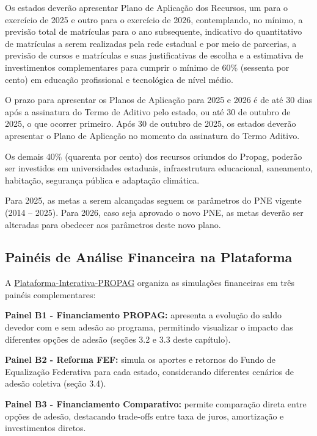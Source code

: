 Os estados deverão apresentar Plano de Aplicação dos Recursos, um para o exercício de 2025 e outro para o exercício de 2026, contemplando, no mínimo, a previsão total de matrículas para o ano subsequente, indicativo do quantitativo de matrículas a serem realizadas pela rede estadual e por meio de parcerias, a previsão de cursos e matrículas e suas justificativas de escolha e a estimativa de investimentos complementares para cumprir o mínimo de 60\% (sessenta por cento) em educação profissional e tecnológica de nível médio.

O prazo para apresentar os Planos de Aplicação para 2025 e 2026 é de até 30 dias após a assinatura do Termo de Aditivo pelo estado, ou até 30 de outubro de 2025, o que ocorrer primeiro. Após 30 de outubro de 2025, os estados deverão apresentar o Plano de Aplicação no momento da assinatura do Termo Aditivo. 

Os demais 40\% (quarenta por cento) dos recursos oriundos do Propag, poderão ser investidos em universidades estaduais, infraestrutura educacional, saneamento, habitação, segurança pública e adaptação climática.

Para 2025, as metas a serem alcançadas seguem os parâmetros do PNE vigente (2014 – 2025). Para 2026, caso seja aprovado o novo PNE, as metas deverão ser alteradas para obedecer aos parâmetros deste novo plano.


\subsection{Painéis de Análise Financeira na Plataforma}

A \href{https://datanalytics.worldbank.org/content/6604f317-d487-436a-b6b6-792369b341f0}{Plataforma-Interativa-PROPAG} organiza as simulações financeiras em três painéis complementares:

\textbf{Painel B1 - Financiamento PROPAG:} apresenta a evolução do saldo devedor com e sem adesão ao programa, permitindo visualizar o impacto das diferentes opções de adesão (seções 3.2 e 3.3 deste capítulo).

\textbf{Painel B2 - Reforma FEF:} simula os aportes e retornos do Fundo de Equalização Federativa para cada estado, considerando diferentes cenários de adesão coletiva (seção 3.4).

\textbf{Painel B3 - Financiamento Comparativo:} permite comparação direta entre opções de adesão, destacando trade-offs entre taxa de juros, amortização e investimentos diretos.


